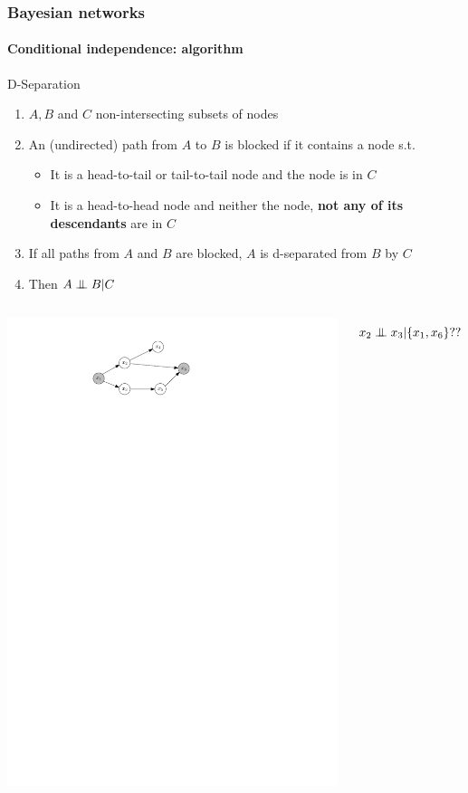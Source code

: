 \documentclass[slidestop,compress,mathserif]{beamer}
\newcommand{\indep}{\ensuremath{\perp\mkern -10mu \perp}}
\begin{document}
\begin{frame}
	\frametitle{Bayesian networks}
	\framesubtitle{Conditional independence: algorithm}
    \vspace{-.5cm}
    \begin{block}{D-Separation}
    \begin{enumerate}
    \item $A,B$ and $C$ non-intersecting subsets of nodes
   \item An (undirected) path from $A$ to $B$ is blocked if it contains
    a node s.t.
    \begin{itemize}
    \item It is a head-to-tail or tail-to-tail node and
    the node is in $C$
    \item It is a head-to-head node and neither the node,
    \textbf{not any of its descendants} are in $C$
    \end{itemize}
    \item If all paths from $A$ and $B$ are blocked,
    $A$ is d-separated from $B$ by $C$
    \item Then $A \indep B | C$
    \end{enumerate}
    \end{block}
      \begin{columns}
    \column[c]{6cm}
    \begin{center}
    \includegraphics[width=.7\textwidth]{dsep3}
    \end{center}
    \column[c]{6cm}
    $$x_2\indep x_3|\{x_1,x_6\}??$$
    \end{columns}
   
\end{frame}
\end{document}
